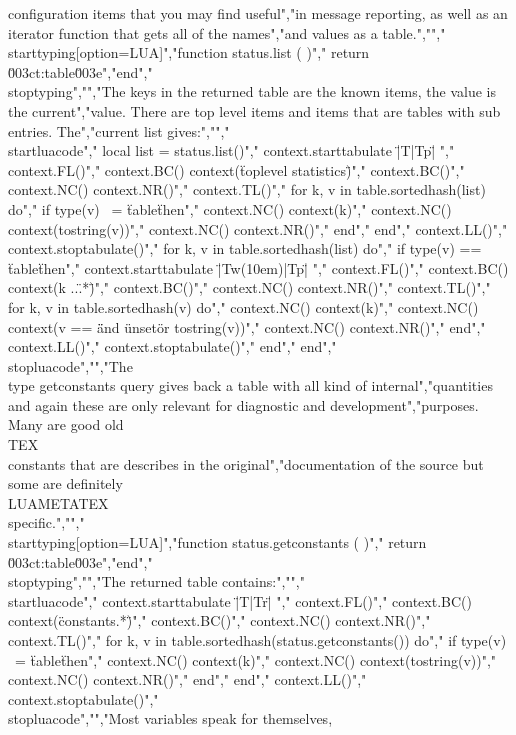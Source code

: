 configuration items that you may find useful","in message reporting, as well as an iterator function that gets all of the names","and values as a table.","","\\starttyping[option=LUA]","function status.list ( )","    return \u003ct:table\u003e","end","\\stoptyping","","The keys in the returned table are the known items, the value is the current","value. There are top level items and items that are tables with sub entries. The","current list gives:","","\\startluacode","    local list = status.list()","    context.starttabulate { \"|T|Tp|\" }","        context.FL()","        context.BC() context(\"toplevel statistics\")","        context.BC()","        context.NC() context.NR()","        context.TL()","        for k, v in table.sortedhash(list) do","            if type(v) ~= \"table\" then","                context.NC() context(k)","                context.NC() context(tostring(v))","                context.NC() context.NR()","            end","        end","        context.LL()","    context.stoptabulate()","    for k, v in table.sortedhash(list) do","        if type(v) == \"table\" then","            context.starttabulate { \"|Tw(10em)|Tp|\" }","                context.FL()","                context.BC() context(k ..\".*\")","                context.BC()","                context.NC() context.NR()","                context.TL()","                for k, v in table.sortedhash(v) do","                    context.NC() context(k)","                    context.NC() context(v == \"\" and \"unset\" or tostring(v))","                    context.NC() context.NR()","                end","                context.LL()","            context.stoptabulate()","        end","    end","\\stopluacode","","The \\type {getconstants} query gives back a table with all kind of internal","quantities and again these are only relevant for diagnostic and development","purposes. Many are good old \\TEX\\ constants that are describes in the original","documentation of the source but some are definitely \\LUAMETATEX\\ specific.","","\\starttyping[option=LUA]","function status.getconstants ( )","    return \u003ct:table\u003e","end","\\stoptyping","","The returned table contains:","","\\startluacode","    context.starttabulate { \"|T|Tr|\" }","        context.FL()","        context.BC() context(\"constants.*\")","        context.BC()","        context.NC() context.NR()","        context.TL()","        for k, v in table.sortedhash(status.getconstants()) do","            if type(v) ~= \"table\" then","                context.NC() context(k)","                context.NC() context(tostring(v))","                context.NC() context.NR()","            end","        end","        context.LL()","    context.stoptabulate()","\\stopluacode","","Most variables speak for themselves, 